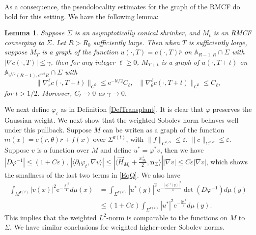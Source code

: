 \documentclass[12pt]{amsart}
\numberwithin{equation}{section}
\newtheorem{lemma}[theorem]{Lemma}
\numberwithin{equation}{section}
\newcommand{\eps}{\varepsilon}
\newcommand{\bn}{\mathbf{n}}
\begin{document}
	As a consequence, the pseudolocality estimates for the graph of the RMCF do hold for this setting. We have the following lemma:
	
	\begin{lemma}
		Suppose $\Sigma$ is an asymptotically conical shrinker, and $M_t$ is an RMCF converging to $\Sigma$. Let $R>R_0$ sufficiently large. Then when $T$ is sufficiently large, suppose $M_T$ is a graph of the function $u(\cdot,T)=c(\cdot,T)\bar r$ on $\mathbb A_{R-1,R}\cap\Sigma$ with $|\nabla c(\cdot,T)|\leq \gamma$, then for any integer $\ell\geq 0$, $M_{T+t}$ is a graph of $u(\cdot,T+t)$ on $\mathbb A_{\mathrm{e}^{t/2}(R-1),\mathrm{e}^{t/2}R}\cap\Sigma$ with 
		\[
		\|\nabla^\ell_r c(\cdot,T+t)\|_{C^0}\leq \mathrm{e}^{-lt/2}C_\ell,\ \ \ 
		\|\nabla^\ell_\theta c(\cdot,T+t)\|_{C^0}\leq C_\ell,
		\]
		for $t>1/2$. Moreover, $C_\ell\to 0$ as $\gamma\to 0$.
	\end{lemma}
	
	We next define $\varphi_t$ as in Definition \ref{DefTransplant}. It is clear that $\varphi$ preserves the Gaussian weight. We next show that the weighted Sobolev norm behaves well under this pullback. Suppose $M$ can be writen as a graph of the function $m(x)=c(r,\theta)\bar r+f(x)$ over $\Sigma^{\mathbf{r}(t)}$, with $\|f\|_{C^{2,\alpha}}\leq \eps$, $\|c\|_{C^{2,\alpha}}\leq \eps$. Suppose $v$ is a function over $M$ and define $u^*=\varphi^* v$, then we have $|D\varphi^{-1}|\leq (1+C\eps)$, $|\langle \partial_t\varphi_t,\nabla v\rangle|\leq |\langle \vec H_{M_t}+\frac{x^\perp_{M_t}}{2},\bn_{\Sigma}\rangle||\nabla v|\leq C\eps |\nabla v|$, which shows the smallness of the last two terms in \eqref{EqQ}. We also have
	\begin{equation}\label{EqNormCompare}
		\begin{aligned}
			\int_{M^{\mathbf r(t)}} |v(x)|^2\mathrm{e}^{-\frac{|x|^2}{4}}d\mu(x)&=\int_{\Sigma^{\mathbf r(t)}} |u^*(y)|^2\mathrm{e}^{-\frac{|\varphi^{-1}_t(y)|^2}{4}}\det(D\varphi^{-1})d\mu(y)\\
			&\leq (1+ C\eps ) \int_{\Sigma^{\mathbf r(t)}} |u^*|^2\mathrm{e}^{-\frac{|y|^2}{4}} d\mu(y). 
		\end{aligned}
	\end{equation}
	This implies that the weighted $L^2$-norm is comparable to the functions on $M$ to $\Sigma$. We have similar conclusions for weighted higher-order Sobolev norms.
	
\end{document}
